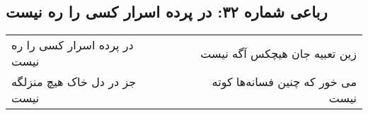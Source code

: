 \begin{center}
\section*{رباعی شماره ۳۲: در پرده اسرار کسی را ره نیست}
\label{sec:sh032}
\begin{longtable}{l p{0.5cm} r}
در پرده اسرار کسی را ره نیست
&&
زین تعبیه جان هیچکس آگه نیست
\\
جز در دل خاک هیچ منزلگه نیست
&&
می خور که چنین فسانه‌ها کوته نیست
\\
\end{longtable}
\end{center}
